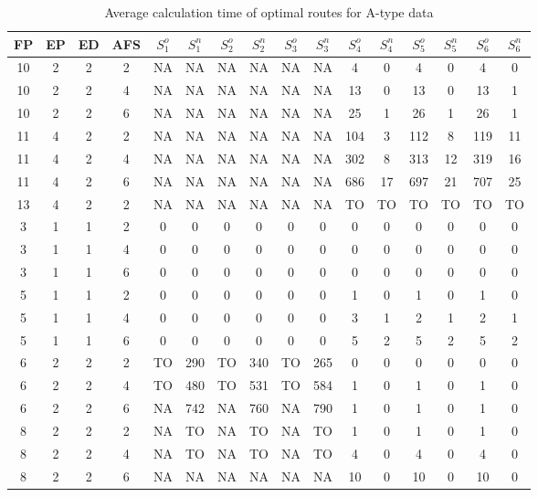 \begin{longtable}{|c|c|c|c|c c|c c|c c|c c|c c|c c|}
\caption{Average calculation time of optimal routes for A-type data}
\label{tab:avg_time_a} \\
\hline
 FP & EP & ED & AFS & $S^o_1$ & $S^n_1$ & $S^o_2$ & $S^n_2$ & $S^o_3$ & $S^n_3$ & $S^o_4$ & $S^n_4$ & $S^o_5$ & $S^n_5$ & $S^o_6$ & $S^n_6$ \\
\hline\hline
10 & 2 & 2 & 2 & NA & NA & NA & NA & NA & NA & 4 & 0 & 4 & 0 & 4 & 0 \\
\hline
10 & 2 & 2 & 4 & NA & NA & NA & NA & NA & NA & 13 & 0 & 13 & 0 & 13 & 1 \\
\hline
10 & 2 & 2 & 6 & NA & NA & NA & NA & NA & NA & 25 & 1 & 26 & 1 & 26 & 1 \\
\hline
11 & 4 & 2 & 2 & NA & NA & NA & NA & NA & NA & 104 & 3 & 112 & 8 & 119 & 11 \\
\hline
11 & 4 & 2 & 4 & NA & NA & NA & NA & NA & NA & 302 & 8 & 313 & 12 & 319 & 16 \\
\hline
11 & 4 & 2 & 6 & NA & NA & NA & NA & NA & NA & 686 & 17 & 697 & 21 & 707 & 25 \\
\hline
13 & 4 & 2 & 2 & NA & NA & NA & NA & NA & NA & TO & TO & TO & TO & TO & TO \\
\hline
3 & 1 & 1 & 2 & 0 & 0 & 0 & 0 & 0 & 0 & 0 & 0 & 0 & 0 & 0 & 0 \\
\hline
3 & 1 & 1 & 4 & 0 & 0 & 0 & 0 & 0 & 0 & 0 & 0 & 0 & 0 & 0 & 0 \\
\hline
3 & 1 & 1 & 6 & 0 & 0 & 0 & 0 & 0 & 0 & 0 & 0 & 0 & 0 & 0 & 0 \\
\hline
5 & 1 & 1 & 2 & 0 & 0 & 0 & 0 & 0 & 0 & 1 & 0 & 1 & 0 & 1 & 0 \\
\hline
5 & 1 & 1 & 4 & 0 & 0 & 0 & 0 & 0 & 0 & 3 & 1 & 2 & 1 & 2 & 1 \\
\hline
5 & 1 & 1 & 6 & 0 & 0 & 0 & 0 & 0 & 0 & 5 & 2 & 5 & 2 & 5 & 2 \\
\hline
6 & 2 & 2 & 2 & TO & 290 & TO & 340 & TO & 265 & 0 & 0 & 0 & 0 & 0 & 0 \\
\hline
6 & 2 & 2 & 4 & TO & 480 & TO & 531 & TO & 584 & 1 & 0 & 1 & 0 & 1 & 0 \\
\hline
6 & 2 & 2 & 6 & NA & 742 & NA & 760 & NA & 790 & 1 & 0 & 1 & 0 & 1 & 0 \\
\hline
8 & 2 & 2 & 2 & NA & TO & NA & TO & NA & TO & 1 & 0 & 1 & 0 & 1 & 0 \\
\hline
8 & 2 & 2 & 4 & NA & TO & NA & TO & NA & TO & 4 & 0 & 4 & 0 & 4 & 0 \\
\hline
8 & 2 & 2 & 6 & NA & NA & NA & NA & NA & NA & 10 & 0 & 10 & 0 & 10 & 0 \\
\hline
\end{longtable}